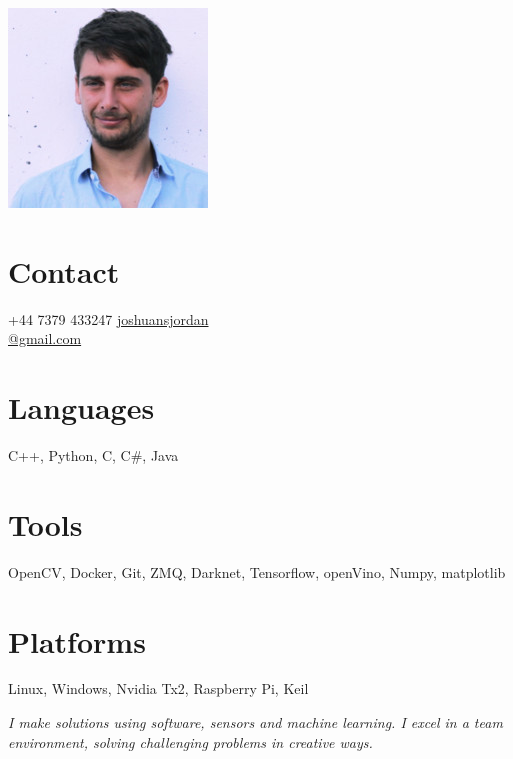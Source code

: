\documentclass[print]{friggeri-cv} %
\begin{document}

\begin{aside} %
\includegraphics[width=0.6\columnwidth]{0.jpg} %
\section{Contact}
+44 7379 433247
\href{mailto:joshuansjordan@gmail.com}{joshuansjordan\\@gmail.com}
\section{Languages}
C++, Python, C, C\#, Java
\section{Tools}
OpenCV, Docker, Git, ZMQ, Darknet, Tensorflow, openVino, Numpy, matplotlib
\section{Platforms}
Linux, Windows, Nvidia Tx2, Raspberry Pi, Keil
\end{aside}

\emph{I make solutions using software, sensors and machine learning. I excel in a team environment, solving challenging problems in creative ways.}
\end{document}
